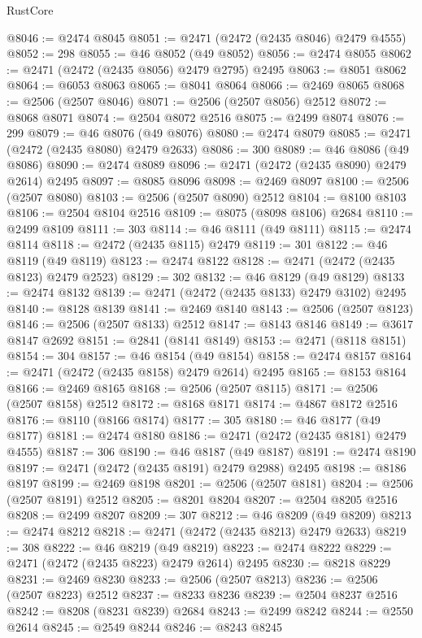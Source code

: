 \begin{lexlean}{RustCore}
\begin{coremodule}
@8046 := @2474 @8045
@8051 := @2471 (@2472 (@2435 @8046) @2479 @4555)
@8052 := 298
@8055 := @46 @8052 (@49 @8052)
@8056 := @2474 @8055
@8062 := @2471 (@2472 (@2435 @8056) @2479 @2795) @2495
@8063 := @8051 @8062
@8064 := @6053 @8063
@8065 := @8041 @8064
@8066 := @2469 @8065
@8068 := @2506 (@2507 @8046)
@8071 := @2506 (@2507 @8056) @2512
@8072 := @8068 @8071
@8074 := @2504 @8072 @2516
@8075 := @2499 @8074
@8076 := 299
@8079 := @46 @8076 (@49 @8076)
@8080 := @2474 @8079
@8085 := @2471 (@2472 (@2435 @8080) @2479 @2633)
@8086 := 300
@8089 := @46 @8086 (@49 @8086)
@8090 := @2474 @8089
@8096 := @2471 (@2472 (@2435 @8090) @2479 @2614) @2495
@8097 := @8085 @8096
@8098 := @2469 @8097
@8100 := @2506 (@2507 @8080)
@8103 := @2506 (@2507 @8090) @2512
@8104 := @8100 @8103
@8106 := @2504 @8104 @2516
@8109 := @8075 (@8098 @8106) @2684
@8110 := @2499 @8109
@8111 := 303
@8114 := @46 @8111 (@49 @8111)
@8115 := @2474 @8114
@8118 := @2472 (@2435 @8115) @2479
@8119 := 301
@8122 := @46 @8119 (@49 @8119)
@8123 := @2474 @8122
@8128 := @2471 (@2472 (@2435 @8123) @2479 @2523)
@8129 := 302
@8132 := @46 @8129 (@49 @8129)
@8133 := @2474 @8132
@8139 := @2471 (@2472 (@2435 @8133) @2479 @3102) @2495
@8140 := @8128 @8139
@8141 := @2469 @8140
@8143 := @2506 (@2507 @8123)
@8146 := @2506 (@2507 @8133) @2512
@8147 := @8143 @8146
@8149 := @3617 @8147 @2692
@8151 := @2841 (@8141 @8149)
@8153 := @2471 (@8118 @8151)
@8154 := 304
@8157 := @46 @8154 (@49 @8154)
@8158 := @2474 @8157
@8164 := @2471 (@2472 (@2435 @8158) @2479 @2614) @2495
@8165 := @8153 @8164
@8166 := @2469 @8165
@8168 := @2506 (@2507 @8115)
@8171 := @2506 (@2507 @8158) @2512
@8172 := @8168 @8171
@8174 := @4867 @8172 @2516
@8176 := @8110 (@8166 @8174)
@8177 := 305
@8180 := @46 @8177 (@49 @8177)
@8181 := @2474 @8180
@8186 := @2471 (@2472 (@2435 @8181) @2479 @4555)
@8187 := 306
@8190 := @46 @8187 (@49 @8187)
@8191 := @2474 @8190
@8197 := @2471 (@2472 (@2435 @8191) @2479 @2988) @2495
@8198 := @8186 @8197
@8199 := @2469 @8198
@8201 := @2506 (@2507 @8181)
@8204 := @2506 (@2507 @8191) @2512
@8205 := @8201 @8204
@8207 := @2504 @8205 @2516
@8208 := @2499 @8207
@8209 := 307
@8212 := @46 @8209 (@49 @8209)
@8213 := @2474 @8212
@8218 := @2471 (@2472 (@2435 @8213) @2479 @2633)
@8219 := 308
@8222 := @46 @8219 (@49 @8219)
@8223 := @2474 @8222
@8229 := @2471 (@2472 (@2435 @8223) @2479 @2614) @2495
@8230 := @8218 @8229
@8231 := @2469 @8230
@8233 := @2506 (@2507 @8213)
@8236 := @2506 (@2507 @8223) @2512
@8237 := @8233 @8236
@8239 := @2504 @8237 @2516
@8242 := @8208 (@8231 @8239) @2684
@8243 := @2499 @8242
@8244 := @2550 @2614
@8245 := @2549 @8244
@8246 := @8243 @8245

\end{coremodule}
\end{lexlean}
